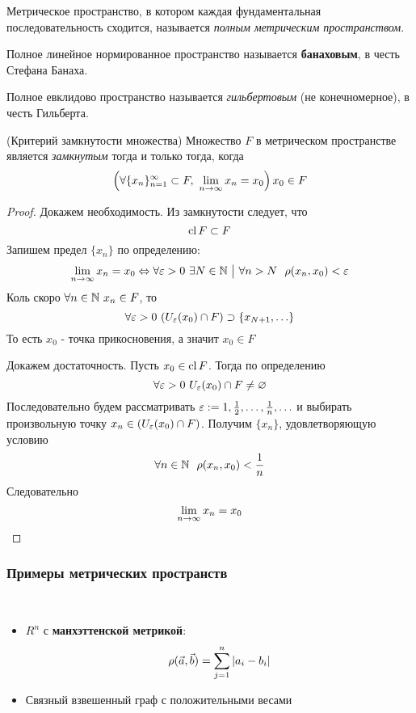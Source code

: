 \begin{definition}
	Метрическое пространство, в котором каждая фундаментальная последовательность сходится, называется \textit{полным метрическим пространством}.
	
	Полное линейное нормированное пространство называется \textbf{банаховым}, в честь Стефана Банаха.
	
	Полное евклидово пространство называется \textit{гильбертовым} (не конечномерное), в честь Гильберта.
\end{definition}

\begin{theorem} (Критерий замкнутости множества)
	Множество $F$ в метрическом пространстве является \textit{замкнутым} тогда и только тогда, когда
	\[
		\left(\forall \{x_n\}_{n = 1}^\infty \subset F,\ \lim\limits_{n \to \infty} x_n = x_0\right) x_0 \in F
	\]
\end{theorem}

\begin{proof}
	Докажем необходимость. Из замкнутости следует, что
	\[
		\operatorname{cl} F \subset F
	\]
	Запишем предел $\{x_n\}$ по определению:
	\[
		\liml_{n \to \infty} x_n = x_0 \lra \forall \eps > 0\ \exists N \in \N \such \forall n > N\ \ \rho(x_n, x_0) < \eps
	\]
	Коль скоро $\forall n \in \mathbb{N}\ x_n \in F$, то
	\[
		\forall \varepsilon > 0\ (U_\varepsilon(x_0) \cap F) \supset \{x_{N + 1}, \ldots\}
	\]
	То есть $x_0$ - точка прикосновения, а значит $x_0 \in F$
	
	Докажем достаточность. Пусть $x_0 \in \operatorname{cl} F$. Тогда по определению
	\[
		\forall \varepsilon > 0\ U_\varepsilon(x_0) \cap F \neq \varnothing
	\]
	Последовательно будем рассматривать $\varepsilon := 1, \frac{1}{2}, \ldots, \frac{1}{n}, \ldots$ и выбирать произвольную точку $x_n \in (U_\varepsilon(x_0) \cap F)$. Получим $\{x_n\}$, удовлетворяющую условию
	\[
		\forall n \in \N\ \ \rho(x_n, x_0) < \frac{1}{n}
	\]
	Следовательно
	\[
		\lim\limits_{n \to \infty} x_n = x_0
	\]
\end{proof}

\subsubsection*{Примеры метрических пространств}

\begin{example}~
\begin{itemize}
	\item $R^n$ с \textbf{манхэттенской метрикой}:
	\[
		\rho(\vec{a}, \vec{b}) = \sum\limits_{j = 1}^n |a_i - b_i|
	\]
	
	\item Связный взвешенный граф с положительными весами
\end{itemize}
\end{example}